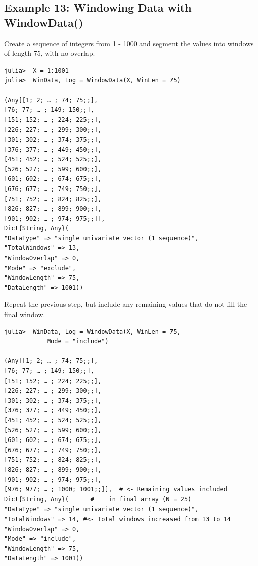 \documentclass[12pt, a4paper, titlepage, openany]{book}
\begin{document}
\newpage
\subsection{\normalsize Example 13: \hspace{15mm} Windowing Data with WindowData()}
\noindent Create a sequence of integers from 1 - 1000 and segment the values into windows of length 75, with no overlap.

\begin{verbatim}
julia>  X = 1:1001
julia>  WinData, Log = WindowData(X, WinLen = 75)

(Any[[1; 2; … ; 74; 75;;], 
[76; 77; … ; 149; 150;;],
[151; 152; … ; 224; 225;;], 
[226; 227; … ; 299; 300;;], 
[301; 302; … ; 374; 375;;], 
[376; 377; … ; 449; 450;;], 
[451; 452; … ; 524; 525;;], 
[526; 527; … ; 599; 600;;], 
[601; 602; … ; 674; 675;;], 
[676; 677; … ; 749; 750;;], 
[751; 752; … ; 824; 825;;], 
[826; 827; … ; 899; 900;;], 
[901; 902; … ; 974; 975;;]], 
Dict{String, Any}(
"DataType" => "single univariate vector (1 sequence)", 
"TotalWindows" => 13, 
"WindowOverlap" => 0, 
"Mode" => "exclude", 
"WindowLength" => 75, 
"DataLength" => 1001))
\end{verbatim}

\newpage
Repeat the previous step, but include any remaining values that do not fill the final window.
\begin{verbatim}
julia>  WinData, Log = WindowData(X, WinLen = 75, 
			Mode = "include")

(Any[[1; 2; … ; 74; 75;;], 
[76; 77; … ; 149; 150;;],
[151; 152; … ; 224; 225;;], 
[226; 227; … ; 299; 300;;], 
[301; 302; … ; 374; 375;;], 
[376; 377; … ; 449; 450;;], 
[451; 452; … ; 524; 525;;], 
[526; 527; … ; 599; 600;;], 
[601; 602; … ; 674; 675;;], 
[676; 677; … ; 749; 750;;], 
[751; 752; … ; 824; 825;;], 
[826; 827; … ; 899; 900;;], 
[901; 902; … ; 974; 975;;],
[976; 977; … ; 1000; 1001;;]],  # <- Remaining values included 
Dict{String, Any}(		#    in final array (N = 25)
"DataType" => "single univariate vector (1 sequence)", 
"TotalWindows" => 14, #<- Total windows increased from 13 to 14
"WindowOverlap" => 0, 
"Mode" => "include", 
"WindowLength" => 75, 
"DataLength" => 1001))

\end{verbatim}
\end{document}
